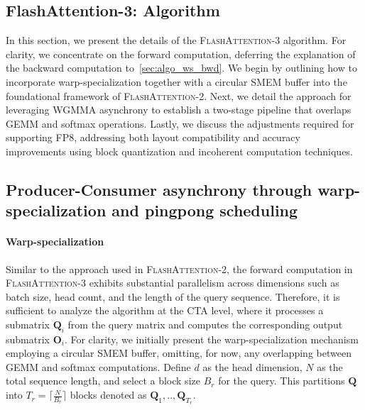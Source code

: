 \begin{enumerate}
\section{FlashAttention-3: Algorithm}
\label{sec:algo}

In this section, we present the details of the \textsc{FlashAttention-3} algorithm. For clarity, we concentrate on the forward computation, deferring the explanation of the backward computation to~\cref{sec:algo_ws_bwd}. We begin by outlining how to incorporate warp-specialization together with a circular SMEM buffer into the foundational framework of \textsc{FlashAttention-2}. Next, we detail the approach for leveraging WGMMA asynchrony to establish a two-stage pipeline that overlaps GEMM and softmax operations. Lastly, we discuss the adjustments required for supporting FP8, addressing both layout compatibility and accuracy improvements using block quantization and incoherent computation techniques.

\subsection{Producer-Consumer asynchrony through warp-specialization and pingpong scheduling}
\label{sec:algo_ws}

\paragraph{Warp-specialization}
Similar to the approach used in \textsc{FlashAttention-2}, the forward computation in \textsc{FlashAttention-3} exhibits substantial parallelism across dimensions such as batch size, head count, and the length of the query sequence. Therefore, it is sufficient to analyze the algorithm at the CTA level, where it processes a submatrix $\mathbf{Q}_i$ from the query matrix and computes the corresponding output submatrix $\mathbf{O}_i$. For clarity, we initially present the warp-specialization mechanism employing a circular SMEM buffer, omitting, for now, any overlapping between GEMM and softmax computations. Define $d$ as the head dimension, $N$ as the total sequence length, and select a block size $B_r$ for the query. This partitions $\mathbf{Q}$ into $T_r = \lceil \frac{N}{B_r} \rceil$ blocks denoted as $\mathbf{Q}_1, .., \mathbf{Q}_{T_r}$.


\end{enumerate}
